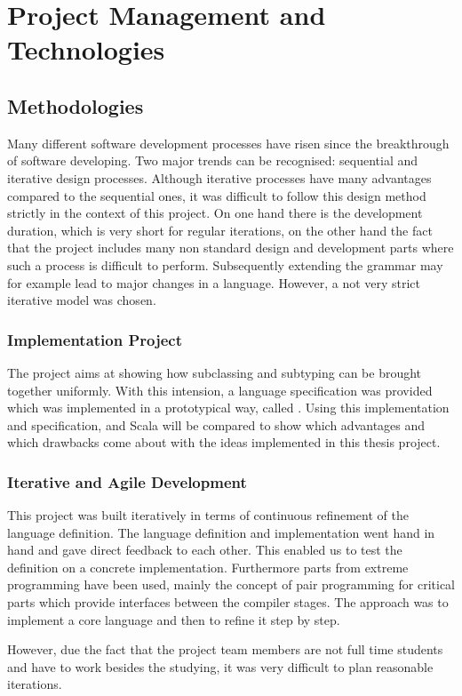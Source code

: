 \chapter{Project Management and Technologies}
\label{ctr:projectManagement}
\section{Methodologies}
Many different software development processes have risen since the
breakthrough of software developing. Two major trends can be recognised:
sequential and iterative design processes. Although iterative processes
have many advantages compared to the sequential ones, it was difficult to
follow this design method strictly in the context of this project. On one
hand there is the development duration, which is very short for regular
iterations, on the other hand the fact that the project includes many non
standard design and development parts where such a process is difficult
to perform. Subsequently extending the grammar may for example lead to
major changes in a language. However, a not very strict iterative model
was chosen.

\subsection{Implementation Project}
The project aims at showing how subclassing and subtyping can be brought
together uniformly. With this intension, a language specification
was provided which was implemented in a prototypical way, called
\ooplss. Using this implementation and specification, \ooplss and Scala
will be compared to show which advantages and which drawbacks come about
with the ideas implemented in this thesis project.

\subsection{Iterative and Agile Development}
This project was built iteratively in terms of continuous refinement
of the language definition. The language definition and implementation
went hand in hand and gave direct feedback to each other. This enabled us
to test the definition on a concrete implementation. Furthermore parts from
extreme programming have been used, mainly the concept of pair programming
for critical parts which provide interfaces between the compiler stages.
The approach was to implement a core language and then to refine it step
by step.

However, due the fact that the project team members are not full time
students and have to work besides the studying, it was very difficult
to plan reasonable iterations.

